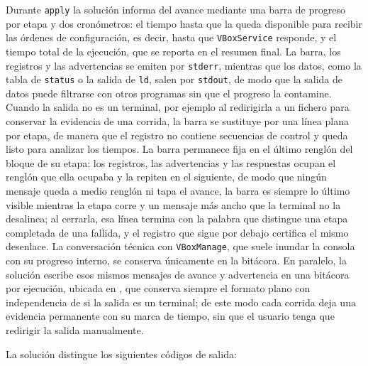 Durante \texttt{apply} la solución informa del avance mediante una barra de progreso por etapa y dos cronómetros: el tiempo hasta que la \vm{} queda disponible para recibir las órdenes de configuración, es decir, hasta que \texttt{VBoxService} responde, y el tiempo total de la ejecución, que se reporta en el resumen final. La barra, los registros y las advertencias se emiten por \texttt{stderr}, mientras que los datos, como la tabla de \texttt{status} o la salida de \texttt{ld}, salen por \texttt{stdout}, de modo que la salida de datos puede filtrarse con otros programas sin que el progreso la contamine. Cuando la salida no es un terminal, por ejemplo al redirigirla a un fichero para conservar la evidencia de una corrida, la barra se sustituye por una línea plana por etapa, de manera que el registro no contiene secuencias de control y queda listo para analizar los tiempos. La barra permanece fija en el último renglón del bloque de su etapa: los registros, las advertencias y las respuestas ocupan el renglón que ella ocupaba y la repiten en el siguiente, de modo que ningún mensaje queda a medio renglón ni tapa el avance, la barra es siempre lo último visible mientras la etapa corre y un mensaje más ancho que la terminal no la desalinea; al cerrarla, esa línea termina con la palabra que distingue una etapa completada de una fallida, y el registro que sigue por debajo certifica el mismo desenlace. La conversación técnica con \texttt{VBoxManage}, que suele inundar la consola con su progreso interno, se conserva únicamente en la bitácora. En paralelo, la solución escribe esos mismos mensajes de avance y advertencia en una bitácora por ejecución, ubicada en , que conserva siempre el formato plano con independencia de si la salida es un terminal; de este modo cada corrida deja una evidencia permanente con su marca de tiempo, sin que el usuario tenga que redirigir la salida manualmente.

La solución distingue los siguientes códigos de salida:

